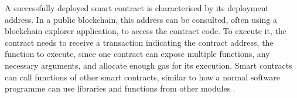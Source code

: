 \documentclass[../access.tex]{subfiles}
\begin{document}
            \par
            A successfully deployed smart contract is characterised by its deployment address. In a public blockchain, this address can be consulted, often using a blockchain explorer application, to access the contract code. To execute it, the contract needs to receive a transaction indicating the contract address, the function to execute, since one contract can expose multiple functions, any necessary arguments, and allocate enough gas for its execution. Smart contracts can call functions of other smart contracts, similar to how a normal software programme can use libraries and functions from other modules \cite{Antonopoulos2018}.
\end{document}
